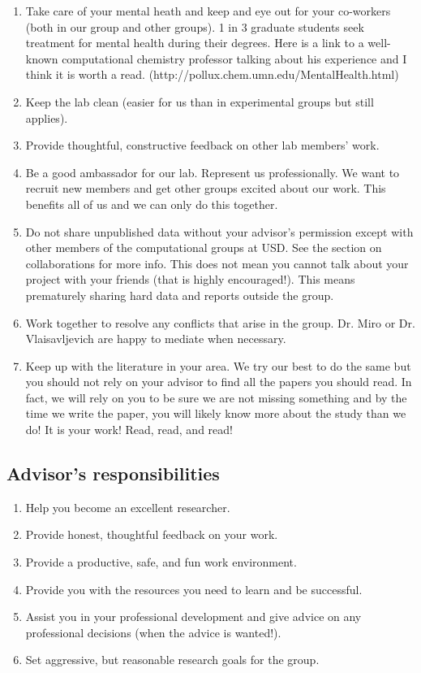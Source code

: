 \documentclass[letterpaper]{article}
\begin{document}
\begin{enumerate}
\item Take care of your mental heath and keep and eye out for your co-workers (both in our group and other groups). 1 in 3 graduate students seek treatment for mental health during their degrees. Here is a link to a well-known computational chemistry professor talking about his experience and I think it is worth a read. (http://pollux.chem.umn.edu/MentalHealth.html)
\item Keep the lab clean (easier for us than in experimental groups but still applies).
\item Provide thoughtful, constructive feedback on other lab members' work.
\item Be a good ambassador for our lab. Represent us professionally. We want to recruit new members and get other groups excited about our work. This benefits all of us and we can only do this together.
\item Do not share unpublished data without your advisor's permission except with other members of the computational groups at USD. See the section on collaborations for more info. This does not mean you cannot talk about your project with your friends (that is highly encouraged!). This means prematurely sharing hard data and reports outside the group.
\item Work together to resolve any conflicts that arise in the group. Dr. Miro or Dr. Vlaisavljevich are happy to mediate when necessary.
\item Keep up with the literature in your area. We try our best to do the same but you should not rely on your advisor to find all the papers you should read. In fact, we will rely on you to be sure we are not missing something and by the time we write the paper, you will likely know more about the study than we do! It is your work! Read, read, and read!
\end{enumerate}

\subsection{Advisor's responsibilities}

\begin{enumerate}
\item Help you become an excellent researcher.
\item Provide honest, thoughtful feedback on your work.
\item Provide a productive, safe, and fun work environment.
\item Provide you with the resources you need to learn and be successful.
\item Assist you in your professional development and give advice on any professional decisions (when the advice is wanted!).
\item Set aggressive, but reasonable research goals for the group.
\end{enumerate}
\end{document}
